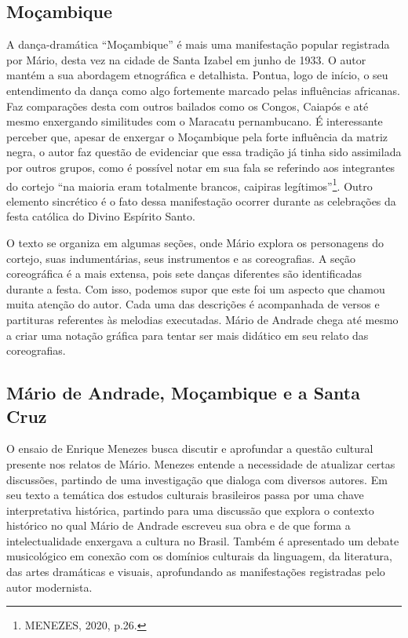 \subsection{Moçambique}

A dança-dramática ``Moçambique'' é mais uma manifestação popular
registrada por Mário, desta vez na cidade de Santa Izabel em junho de
1933. O autor mantém a sua abordagem etnográfica e detalhista. Pontua,
logo de início, o seu entendimento da dança como algo fortemente marcado
pelas influências africanas. Faz comparações desta com outros bailados
como os Congos, Caiapós e até mesmo enxergando similitudes com o
Maracatu pernambucano. É interessante perceber que, apesar de enxergar o
Moçambique pela forte influência da matriz negra, o autor faz questão de
evidenciar que essa tradição já tinha sido assimilada por outros grupos,
como é possível notar em sua fala se referindo aos integrantes do
cortejo ``na maioria eram totalmente brancos, caipiras
legítimos''\footnote{MENEZES, 2020, p.26.}. Outro elemento sincrético é
o fato dessa manifestação ocorrer durante as celebrações da festa
católica do Divino Espírito Santo.

O texto se organiza em algumas seções, onde Mário explora os personagens
do cortejo, suas indumentárias, seus instrumentos e as coreografias. A
seção coreográfica é a mais extensa, pois sete danças diferentes são
identificadas durante a festa. Com isso, podemos supor que este foi um
aspecto que chamou muita atenção do autor. Cada uma das descrições é
acompanhada de versos e partituras referentes às melodias executadas.
Mário de Andrade chega até mesmo a criar uma notação gráfica para tentar
ser mais didático em seu relato das coreografias.

\subsection{Mário de Andrade, Moçambique e a Santa Cruz}

O ensaio de Enrique Menezes busca discutir e aprofundar a questão
cultural presente nos relatos de Mário. Menezes entende a necessidade de
atualizar certas discussões, partindo de uma investigação que dialoga
com diversos autores. Em seu texto a temática dos estudos culturais
brasileiros passa por uma chave interpretativa histórica, partindo para
uma discussão que explora o contexto histórico no qual Mário de Andrade
escreveu sua obra e de que forma a intelectualidade enxergava a cultura
no Brasil. Também é apresentado um debate musicológico em conexão com os
domínios culturais da linguagem, da literatura, das artes dramáticas e
visuais, aprofundando as manifestações registradas pelo autor
modernista.

